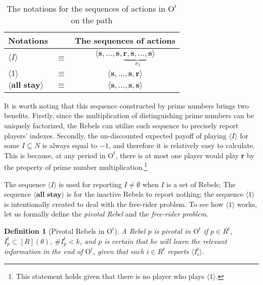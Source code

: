 \documentclass[12pt,letter]{article}
\newcommand{\Omicron}{\mathrm{O}}
\newtheorem{definition}{Definition}[section]
\theoremstyle{definition}
\theoremstyle{remark}
\theoremstyle{claim}
\begin{document}
\begin{table}[!htbp]
\caption{The notations for the sequences of actions in $\Omicron^t$ on the path}
\label{Table_msg_form}
\begin{center}
\begin{tabular}{l c c}
Notations && The sequences of actions\\
\hline
\hline
$\langle  I \rangle$ 				& $\equiv$ 			& $\langle \textbf{s},...,\textbf{s},\underbrace{\textbf{r},\textbf{s},...,\textbf{s}}_{x_{I}} \rangle$  \\
$\langle 1 \rangle$	 					& $\equiv$ 			& $\langle \textbf{s},...,\textbf{s},{\textbf{r}}\rangle$  \\
$\langle \textbf{all stay} \rangle$	 					& $\equiv$ 			& $\langle \textbf{s},...,\textbf{s},{\textbf{s}}\rangle$  \\
\hline
\end{tabular}
\end{center}
\end{table}


It is worth noting that this sequence constructed by prime numbers brings two benefits. Firstly, since the multiplication of distinguishing prime numbers can be uniquely factorized, the Rebels can utilize such sequence to precisely report players' indexes. Secondly, the un-discounted expected payoff of playing $\langle I \rangle$ for some $I\subseteq N$ is always equal to $-1$, and therefore it is relatively easy to calculate. This is because, at any period in $\Omicron^{t}$, there is at most one player would play \textbf{r} by the property of prime number multiplication.\footnote{This statement holds given that there is no player who plays $\langle 1 \rangle$.} 

The sequence $\langle I \rangle$ is used for reporting $I\neq \emptyset$ when $I$ is a set of Rebels; The sequence $\langle \textbf{all stay} \rangle$ is for the inactive Rebels to report nothing; the sequence $\langle 1 \rangle$ is intentionally created to deal with the free-rider problem. To see how $\langle 1 \rangle$ works, let us formally define the \textit{pivotal Rebel} and the \textit{free-rider problem}. 
\begin{definition}[Pivotal Rebels in $\Omicron^t$]
A Rebel $p$ is pivotal in $\Omicron^t$ if $p\in R^t$, $I^t_p\subset [R](\theta)$, $\# I^t_p<k$, and $p$ is certain that he will learn the relevant information in the end of $\Omicron^t$, given that each $i\in R^t$ reports $\langle I^t_i \rangle$.
\end{definition}
\end{document}
